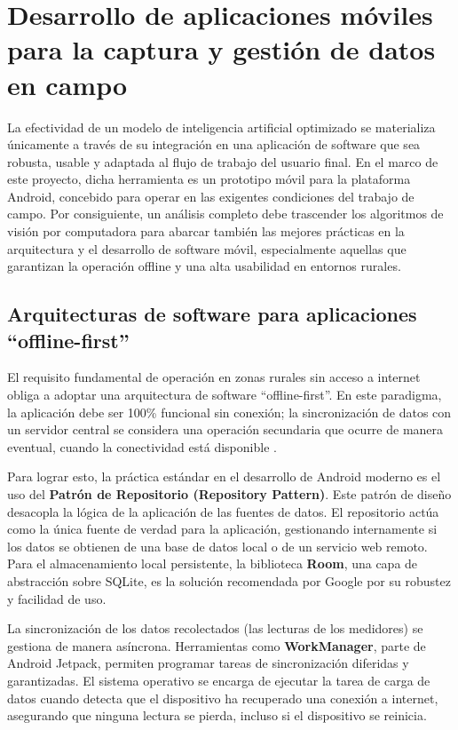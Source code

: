 \section{Desarrollo de aplicaciones móviles para la captura y gestión de datos en campo}
\label{sec:mobile_app_development}

La efectividad de un modelo de inteligencia artificial optimizado se materializa únicamente a través de su integración en una aplicación de software que sea robusta, usable y adaptada al flujo de trabajo del usuario final. En el marco de este proyecto, dicha herramienta es un prototipo móvil para la plataforma Android, concebido para operar en las exigentes condiciones del trabajo de campo. Por consiguiente, un análisis completo debe trascender los algoritmos de visión por computadora para abarcar también las mejores prácticas en la arquitectura y el desarrollo de software móvil, especialmente aquellas que garantizan la operación offline y una alta usabilidad en entornos rurales.

\subsection{Arquitecturas de software para aplicaciones ``offline-first''}
\label{ssec:offline_first_architecture}

El requisito fundamental de operación en zonas rurales sin acceso a internet obliga a adoptar una arquitectura de software ``offline-first''. En este paradigma, la aplicación debe ser 100\% funcional sin conexión; la sincronización de datos con un servidor central se considera una operación secundaria que ocurre de manera eventual, cuando la conectividad está disponible \parencite{Santiago2020Deployment}.

Para lograr esto, la práctica estándar en el desarrollo de Android moderno es el uso del \textbf{Patrón de Repositorio (Repository Pattern)}. Este patrón de diseño desacopla la lógica de la aplicación de las fuentes de datos. El repositorio actúa como la única fuente de verdad para la aplicación, gestionando internamente si los datos se obtienen de una base de datos local o de un servicio web remoto. Para el almacenamiento local persistente, la biblioteca \textbf{Room}, una capa de abstracción sobre SQLite, es la solución recomendada por Google por su robustez y facilidad de uso.

La sincronización de los datos recolectados (las lecturas de los medidores) se gestiona de manera asíncrona. Herramientas como \textbf{WorkManager}, parte de Android Jetpack, permiten programar tareas de sincronización diferidas y garantizadas. El sistema operativo se encarga de ejecutar la tarea de carga de datos cuando detecta que el dispositivo ha recuperado una conexión a internet, asegurando que ninguna lectura se pierda, incluso si el dispositivo se reinicia.

